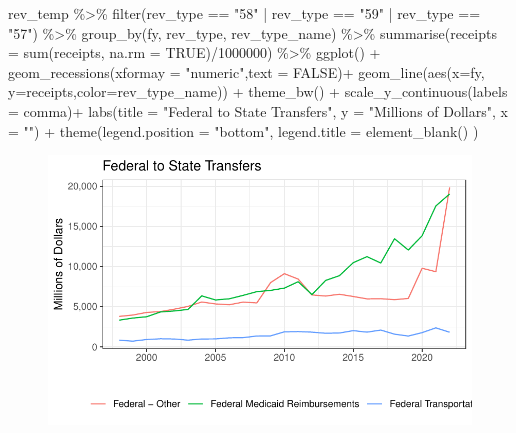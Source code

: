 \documentclass[
  letterpaper,
  DIV=11,
  numbers=noendperiod]{scrreport}
\newenvironment{Shaded}{\begin{snugshade}}{\end{snugshade}}
\newcommand{\AttributeTok}[1]{\textcolor[rgb]{0.40,0.45,0.13}{#1}}
\newcommand{\ConstantTok}[1]{\textcolor[rgb]{0.56,0.35,0.01}{#1}}
\newcommand{\DecValTok}[1]{\textcolor[rgb]{0.68,0.00,0.00}{#1}}
\newcommand{\FunctionTok}[1]{\textcolor[rgb]{0.28,0.35,0.67}{#1}}
\newcommand{\NormalTok}[1]{\textcolor[rgb]{0.00,0.23,0.31}{#1}}
\newcommand{\SpecialCharTok}[1]{\textcolor[rgb]{0.37,0.37,0.37}{#1}}
\newcommand{\StringTok}[1]{\textcolor[rgb]{0.13,0.47,0.30}{#1}}
\begin{document}
\begin{Shaded}
\begin{Highlighting}[]
\NormalTok{rev\_temp }\SpecialCharTok{\%\textgreater{}\%} 
  \FunctionTok{filter}\NormalTok{(rev\_type }\SpecialCharTok{==} \StringTok{"58"} \SpecialCharTok{|}\NormalTok{ rev\_type }\SpecialCharTok{==} \StringTok{"59"} \SpecialCharTok{|}\NormalTok{ rev\_type }\SpecialCharTok{==} \StringTok{"57"}\NormalTok{) }\SpecialCharTok{\%\textgreater{}\%} 
  \FunctionTok{group\_by}\NormalTok{(fy, rev\_type, rev\_type\_name) }\SpecialCharTok{\%\textgreater{}\%} 
  \FunctionTok{summarise}\NormalTok{(}\AttributeTok{receipts =} \FunctionTok{sum}\NormalTok{(receipts, }\AttributeTok{na.rm =} \ConstantTok{TRUE}\NormalTok{)}\SpecialCharTok{/}\DecValTok{1000000}\NormalTok{) }\SpecialCharTok{\%\textgreater{}\%} 
  \FunctionTok{ggplot}\NormalTok{() }\SpecialCharTok{+}
      \FunctionTok{geom\_recessions}\NormalTok{(}\AttributeTok{xformay =} \StringTok{"numeric"}\NormalTok{,}\AttributeTok{text =} \ConstantTok{FALSE}\NormalTok{)}\SpecialCharTok{+}
  \FunctionTok{geom\_line}\NormalTok{(}\FunctionTok{aes}\NormalTok{(}\AttributeTok{x=}\NormalTok{fy, }\AttributeTok{y=}\NormalTok{receipts,}\AttributeTok{color=}\NormalTok{rev\_type\_name)) }\SpecialCharTok{+}
      \FunctionTok{theme\_bw}\NormalTok{() }\SpecialCharTok{+}
  \FunctionTok{scale\_y\_continuous}\NormalTok{(}\AttributeTok{labels =}\NormalTok{ comma)}\SpecialCharTok{+}
  \FunctionTok{labs}\NormalTok{(}\AttributeTok{title =} \StringTok{"Federal to State Transfers"}\NormalTok{, }
       \AttributeTok{y =} \StringTok{"Millions of Dollars"}\NormalTok{, }\AttributeTok{x =} \StringTok{""}\NormalTok{) }\SpecialCharTok{+} 
  \FunctionTok{theme}\NormalTok{(}\AttributeTok{legend.position =} \StringTok{"bottom"}\NormalTok{, }\AttributeTok{legend.title =} \FunctionTok{element\_blank}\NormalTok{()  )}
\end{Highlighting}
\end{Shaded}

\begin{figure}[H]

{\centering \includegraphics{./Everything_files/figure-pdf/create-rev-federal-transfers-1.pdf}

}

\end{figure}
\end{document}
